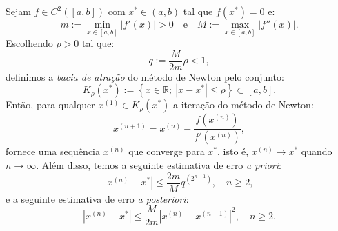 \begin{teo}
  Sejam $f\in C^2([a, b])$ com $x^*\in (a, b)$ tal que $f(x^*) = 0$ e:
  \begin{equation}
    m := \min_{x\in [a, b]}|f'(x)| > 0\quad\text{e}\quad M := \max_{x\in [a, b]} |f''(x)|.
  \end{equation}
Escolhendo $\rho > 0$ tal que:
\begin{equation}
  q := \frac{M}{2m}\rho < 1,
\end{equation}
definimos a \emph{bacia de atração} do método de Newton pelo conjunto:
\begin{equation}
  K_\rho(x^*) := \left\{x\in\mathbb{R};~|x-x^*| \leq \rho\right\}\subset [a, b].
\end{equation}
Então, para qualquer $x^{(1)}\in K_\rho(x^*)$ a iteração do método de Newton:
\begin{equation}
  x^{(n+1)} = x^{(n)} - \frac{f(x^{(n)})}{f'(x^{(n)})},
\end{equation}
fornece uma sequência $x^{(n)}$ que converge para $x^*$, isto é, $x^{(n)}\to x^*$ quando $n\to \infty$. Além disso, temos a seguinte estimativa de erro \emph{a priori}:
\begin{equation}
  |x^{(n)} - x^*| \leq \frac{2m}{M}q^{(2^{n-1})},\quad n\geq 2,
\end{equation}
e a seguinte estimativa de erro \emph{a posteriori}:
\begin{equation}
  |x^{(n)} - x^*| \leq \frac{M}{2m}|x^{(n)} - x^{(n-1)}|^2,\quad n\geq 2.
\end{equation}
\end{teo}
